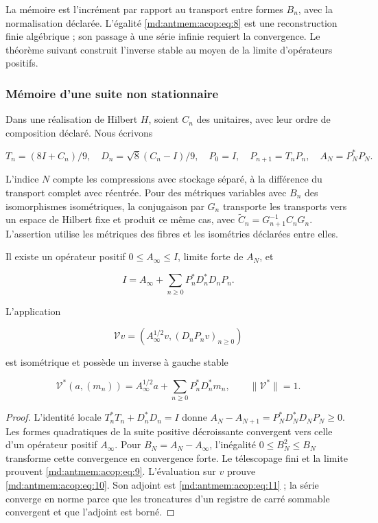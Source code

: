 La mémoire est l’incrément par rapport au transport entre formes \(B_n\), avec la normalisation déclarée. L’égalité \eqref{md:antmem:acop:eq:8} est une reconstruction finie algébrique ; son passage à une série infinie requiert la convergence. Le théorème suivant construit l’inverse stable au moyen de la limite d’opérateurs positifs.


\subsubsection{Mémoire d’une suite non stationnaire}

Dans une réalisation de Hilbert \(H\), soient \(C_n\) des unitaires, avec leur ordre de composition déclaré. Nous écrivons

\[
T_n=(8I+C_n)/9,\quad D_n=\sqrt8(C_n-I)/9,
\quad P_0=I,\quad P_{n+1}=T_nP_n,\quad A_N=P_N^*P_N.
\]

L’indice \(N\) compte les compressions avec stockage séparé, à la différence du transport complet avec réentrée. Pour des métriques variables avec \(B_n\) des isomorphismes isométriques, la conjugaison par \(G_n\) transporte les transports vers un espace de Hilbert fixe et produit ce même cas, avec \(\widetilde C_n=G_{n+1}^{-1}C_nG_n\). L’assertion utilise les métriques des fibres et les isométries déclarées entre elles.

\begin{theorem}
\label{md:antmem:terminal-no-estacionario}
Il existe un opérateur positif \(0\leq A_\infty\leq I\), limite forte de \(A_N\), et

\begin{equation}
\boxed{I=A_\infty+\sum_{n\ge0}P_n^*D_n^*D_nP_n.}
\label{md:antmem:acop:eq:9}
\end{equation}

L'application

\begin{equation}
\boxed{\mathcal Vv=(A_\infty^{1/2}v,(D_nP_nv)_{n\ge0})}
\label{md:antmem:acop:eq:10}
\end{equation}

est isométrique et possède un inverse à gauche stable


\begin{equation}
\mathcal V^*(a,(m_n))=A_\infty^{1/2}a+
\sum_{n\ge0}P_n^*D_n^*m_n,\qquad\|\mathcal V^*\|=1.
\label{md:antmem:acop:eq:11}
\end{equation}

\end{theorem}
\begin{proof}
L’identité locale \(T_n^*T_n+D_n^*D_n=I\) donne
\(A_N-A_{N+1}=P_N^*D_N^*D_NP_N\geq0\). Les formes quadratiques de
la suite positive décroissante convergent vers celle d’un opérateur positif
\(A_\infty\). Pour \(B_N=A_N-A_\infty\), l’inégalité
\(0\leq B_N^2\leq B_N\) transforme cette convergence en convergence forte.
Le télescopage fini et la limite prouvent \eqref{md:antmem:acop:eq:9}. L’évaluation sur \(v\)
prouve \eqref{md:antmem:acop:eq:10}. Son adjoint est \eqref{md:antmem:acop:eq:11} ; la série converge en norme parce que
les troncatures d’un registre de carré sommable convergent et que l’adjoint est borné.
\end{proof}

